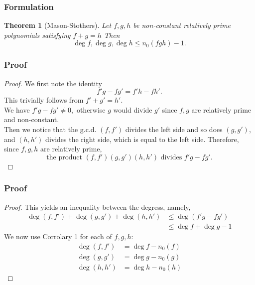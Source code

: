\documentclass[envcountsect]{beamer}
\newtheorem*{theorem*}{Theorem}
\begin{document}
\begin{frame}
\frametitle{Formulation}

\begin{theorem*}[Mason-Stothers]
Let $f,g,h$ be non-constant relatively prime polynomials satisfying $f+g=h$
Then \[\operatorname{deg}f, \operatorname{deg}g, \operatorname{deg}h \leq
  n_0(fgh) -1.\]
\end{theorem*}

\end{frame}

\begin{frame}
  \frametitle{Proof}
  \begin{proof}\let\qed\relax
    We first note the identity
    \[
      f'g - fg' = f'h - fh'.
    \]
    This trivially follows from $f'+g' = h'.$ \\
    We have $f'g - fg' \neq 0,$
    otherwise $g$ would divide $g'$ since $f,g$ are relatively prime and non-constant. \\
    Then we notice that the g.c.d. $(f, f')$ divides the left side and so does
    $(g,g')$, and $(h,h')$ divides the right side, which is equal to the left
    side. Therefore, since $f,g,h$ are relatively prime,
    $$
      \text{the product } (f,f')(g,g')(h,h') \text{ divides } f'g - fg'.
    $$

  \end{proof}
\end{frame}

\begin{frame}
  \frametitle{Proof}
  \begin{proof}\let\qed\relax
    This yields an inequality between the degress, namely,
    \begin{align} 
      \operatorname{deg}(f,f') + \operatorname{deg}(g,g') + \operatorname{deg}(h,h') &\leq
      \operatorname{deg}(f'g - fg') \label{ineq} \\ 
      &\leq \operatorname{deg}f + \operatorname{deg}g - 1 \nonumber
    \end{align}
    We now use Corrolary 1 for each of $f,g,h:$
    \begin{align*}
      \operatorname{deg}(f,f') &= \operatorname{deg}f - n_0(f) \\
      \operatorname{deg}(g,g') &= \operatorname{deg}g - n_0(g) \\
      \operatorname{deg}(h,h') &= \operatorname{deg}h - n_0(h)
    \end{align*}
    \end{proof}


\end{frame}
\end{document}
